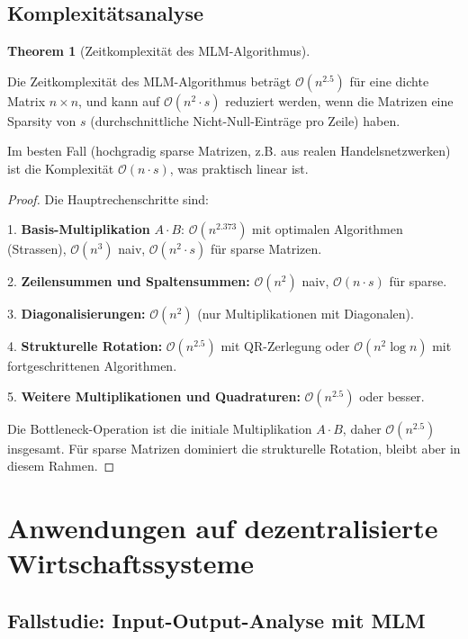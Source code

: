 \documentclass[a4paper,12pt]{article}
\theoremstyle{definition}
\newtheorem{theorem}{Theorem}
\begin{document}
\subsection{Komplexitätsanalyse}

\begin{theorem}[Zeitkomplexität des MLM-Algorithmus]
\label{thm:komplexitaet_mlm}

Die Zeitkomplexität des MLM-Algorithmus beträgt $\mathcal{O}(n^{2.5})$ für eine dichte Matrix $n \times n$, und kann auf $\mathcal{O}(n^2 \cdot s)$ reduziert werden, wenn die Matrizen eine Sparsity von $s$ (durchschnittliche Nicht-Null-Einträge pro Zeile) haben.

Im besten Fall (hochgradig sparse Matrizen, z.B. aus realen Handelsnetzwerken) ist die Komplexität $\mathcal{O}(n \cdot s)$, was praktisch linear ist.

\end{theorem}

\begin{proof}

Die Hauptrechenschritte sind:

1. \textbf{Basis-Multiplikation} $A \cdot B$: $\mathcal{O}(n^{2.373})$ mit optimalen Algorithmen (Strassen), $\mathcal{O}(n^3)$ naiv, $\mathcal{O}(n^2 \cdot s)$ für sparse Matrizen.

2. \textbf{Zeilensummen und Spaltensummen:} $\mathcal{O}(n^2)$ naiv, $\mathcal{O}(n \cdot s)$ für sparse.

3. \textbf{Diagonalisierungen:} $\mathcal{O}(n^2)$ (nur Multiplikationen mit Diagonalen).

4. \textbf{Strukturelle Rotation:} $\mathcal{O}(n^{2.5})$ mit QR-Zerlegung oder $\mathcal{O}(n^2 \log n)$ mit fortgeschrittenen Algorithmen.

5. \textbf{Weitere Multiplikationen und Quadraturen:} $\mathcal{O}(n^{2.5})$ oder besser.

Die Bottleneck-Operation ist die initiale Multiplikation $A \cdot B$, daher $\mathcal{O}(n^{2.5})$ insgesamt. Für sparse Matrizen dominiert die strukturelle Rotation, bleibt aber in diesem Rahmen.

\end{proof}

\section{Anwendungen auf dezentralisierte Wirtschaftssysteme}

\subsection{Fallstudie: Input-Output-Analyse mit MLM}
\end{document}
